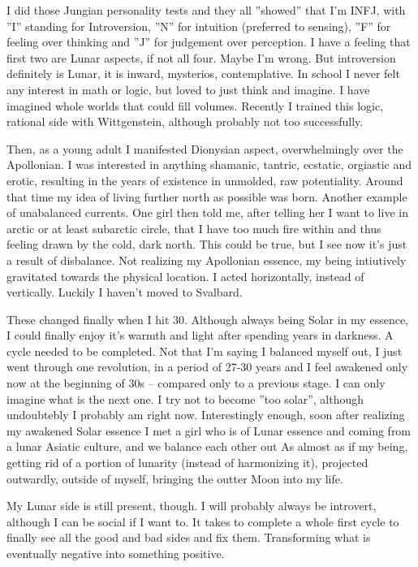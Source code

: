 \begin{footnotesize}
\begin{sffamily}
I did those Jungian personality tests and they all ''showed'' that I'm INFJ, with ''I'' standing for Introversion, ''N'' for intuition (preferred to sensing), ''F'' for feeling over thinking and ''J'' for judgement over perception. I have a feeling that first two are Lunar aspects, if not all four. Maybe I'm wrong. But introversion definitely is Lunar, it is inward, mysterios, contemplative. In school I never felt any interest in math or logic, but loved to just think and imagine. I have imagined whole worlds that could fill volumes. Recently I trained this logic, rational side with Wittgenstein, although probably not too successfully.

Then, as a young adult I manifested Dionysian aspect, overwhelmingly over the Apollonian. I was interested in anything shamanic, tantric, ecstatic, orgiastic and erotic, resulting in the years of existence in unmolded, raw potentiality. Around that time my idea of living further north as possible was born. Another example of unabalanced currents. One girl then told me, after telling her I want to live in arctic or at least subarctic circle, that I have too much fire within and thus feeling drawn by the cold, dark north. This could be true, but I see now it's just a result of disbalance. Not realizing my Apollonian essence, my being intiutively gravitated towards the physical location. I acted horizontally, instead of vertically. Luckily I haven't moved to Svalbard.

These changed finally when I hit 30. Although always being Solar in my essence, I could finally enjoy it's warmth and light after spending years in darkness. A cycle needed to be completed. Not that I'm saying I balanced myself out, I just went through one revolution, in a period of 27-30 years and I feel awakened only now at the beginning of 30s -- compared only to a previous stage. I can only imagine what is the next one. I try not to become ''too solar'', although undoubtebly I probably am right now. Interestingly enough, soon after realizing my awakened Solar essence I met a girl who is of Lunar essence and coming from a lunar Asiatic culture, and we balance each other out As almost as if my being, getting rid of a portion of lunarity (instead of harmonizing it), projected outwardly, outside of myself, bringing the outter Moon into my life.

My Lunar side is still present, though. I will probably always be introvert, although I can be social if I want to. It takes to complete a whole first cycle to finally see all the good and bad sides and fix them. Transforming what is eventually negative into something positive.


\end{sffamily}
\end{footnotesize}
